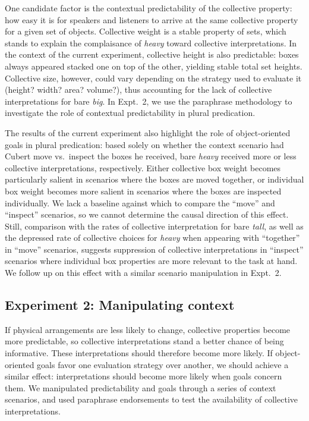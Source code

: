 \documentclass[linguex]{sp}
\begin{document}
One candidate factor is the contextual predictability of the collective property: how easy it is for speakers and listeners to arrive at the same collective property for a given set of objects. Collective weight is a stable property of sets, which stands to explain the complaisance of \emph{heavy} toward collective interpretations. In the context of the current experiment, collective height is also predictable: boxes always appeared stacked one on top of the other, yielding stable total set heights. Collective size, however, could vary depending on the strategy used to evaluate it (height? width? area? volume?), thus accounting for the lack of collective interpretations for bare \emph{big}. In Expt.~2, we use the paraphrase methodology to investigate the role of contextual predictability in plural predication.

The results of the current experiment also highlight the role of object-oriented goals in plural predication: based solely on whether the context scenario had Cubert move vs.~inspect the boxes he received, bare \emph{heavy} received more or less collective interpretations, respectively. Either collective box weight becomes particularly salient in scenarios where the boxes are moved together, or individual box weight becomes more salient in scenarios where the boxes are inspected individually. We lack a baseline against which to compare the ``move'' and ``inspect'' scenarios, so we cannot determine the causal direction of this effect. Still, comparison with the rates of collective interpretation for bare \emph{tall}, as well as the depressed rate of collective choices for \emph{heavy} when appearing with ``together'' in ``move'' scenarios, suggests suppression of collective interpretations in ``inspect'' scenarios where individual box properties are more relevant to the task at hand. We follow up on this effect with a similar scenario manipulation in Expt.~2.


\subsection{Experiment 2: Manipulating context}

If physical arrangements are less likely to change, collective properties become more predictable, so collective interpretations stand a better chance of being informative. These interpretations should therefore become more likely. If object-oriented goals favor one evaluation strategy over another, we should achieve a similar effect: interpretations should become more likely when goals concern them. We manipulated predictability and goals through a series of context scenarios, and used paraphrase endorsements to test the availability of collective interpretations.
\end{document}
